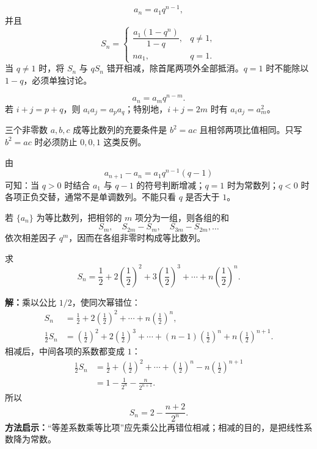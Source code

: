 \begin{lawbox}[等比数列的通项与前 $n$ 项和]
  \[
    a_n=a_1q^{n-1},
  \]
  并且
  \[
    S_n=
    \begin{cases}
      \dfrac{a_1(1-q^n)}{1-q},&q\ne1,\\[6pt]
      na_1,&q=1.
    \end{cases}
  \]
  当 $q\ne1$ 时，将 $S_n$ 与 $qS_n$ 错开相减，除首尾两项外全部抵消。$q=1$ 时不能除以 $1-q$，必须单独讨论。
\end{lawbox}

\begin{corollarybox}[等比数列的下标结构]
  \[
    a_n=a_mq^{n-m}.
  \]
  若 $i+j=p+q$，则 $a_i a_j=a_p a_q$；特别地，$i+j=2m$ 时有 $a_i a_j=a_m^2$。

  三个非零数 $a,b,c$ 成等比数列的充要条件是 $b^2=ac$ 且相邻两项比值相同。只写 $b^2=ac$ 时必须防止 $0,0,1$ 这类反例。
\end{corollarybox}

\begin{corollarybox}[等比数列的单调性]
  由
  \[
    a_{n+1}-a_n=a_1q^{n-1}(q-1)
  \]
  可知：当 $q>0$ 时结合 $a_1$ 与 $q-1$ 的符号判断增减；$q=1$ 时为常数列；$q<0$ 时各项正负交替，通常不是单调数列。不能只看 $q$ 是否大于 $1$。
\end{corollarybox}

\begin{corollarybox}[等比分组仍保留等比结构]
  若 $\{a_n\}$ 为等比数列，把相邻的 $m$ 项分为一组，则各组的和
  \[
    S_m,\quad S_{2m}-S_m,\quad S_{3m}-S_{2m},\ldots
  \]
  依次相差因子 $q^m$，因而在各组非零时构成等比数列。
\end{corollarybox}

\begin{examplebox}
  求
  \[
    S_n=\frac12+2\left(\frac12\right)^2
       +3\left(\frac12\right)^3+\cdots
       +n\left(\frac12\right)^n.
  \]

  \textbf{解：}乘以公比 $1/2$，使同次幂错位：
  \begin{align*}
    S_n&=\frac12+2\left(\frac12\right)^2+\cdots+n\left(\frac12\right)^n,\\
    \frac12S_n&=\left(\frac12\right)^2+2\left(\frac12\right)^3+\cdots
      +(n-1)\left(\frac12\right)^n+n\left(\frac12\right)^{n+1}.
  \end{align*}
  相减后，中间各项的系数都变成 $1$：
  \begin{align*}
    \frac12S_n
      &=\frac12+\left(\frac12\right)^2+\cdots+\left(\frac12\right)^n
        -n\left(\frac12\right)^{n+1}\\
      &=1-\frac1{2^n}-\frac n{2^{n+1}}.
  \end{align*}
  所以
  \[
    \boxed{S_n=2-\frac{n+2}{2^n}}.
  \]
  \textbf{方法启示：}“等差系数乘等比项”应先乘公比再错位相减；相减的目的，是把线性系数降为常数。
\end{examplebox}

